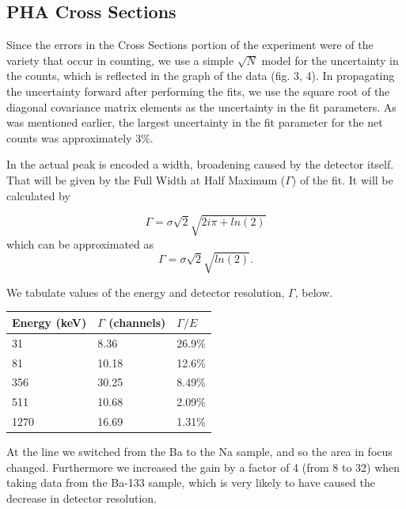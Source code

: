 \documentclass{article}
\begin{document}
	\subsection{PHA Cross Sections}
	Since the errors in the Cross Sections portion of the experiment were of the variety that occur in counting, we use a simple $\sqrt{N}$ model for the uncertainty in the counts, which is reflected in the graph of the data (fig. 3, 4).  In propagating the uncertainty forward after performing the fits, we use the square root of the diagonal covariance matrix elements as the uncertainty in the fit parameters.  As was mentioned earlier, the largest uncertainty in the fit parameter for the net counts was approximately 3\%.

	\begin{flushleft}
	In the actual peak is encoded a width, broadening caused by the detector itself. That will be given by the Full Width at Half Maximum ($\Gamma$) of the fit.  It will be calculated by
	\end{flushleft}
	\begin{equation*}
		\Gamma = \sigma \sqrt{2}\sqrt{2i\pi + ln(2)}
	\end{equation*}
	which can be approximated as
	\begin{equation}
		\Gamma = \sigma \sqrt{2}\sqrt{ln(2)}.
	\end{equation}

	\begin{flushleft}
	We tabulate values of the energy and detector resolution, $\Gamma$, below.
	\end{flushleft}

	\begin{center}
	\begin{tabular}{|l|l|l|}
		\hline
		Energy (keV) & $\Gamma$ (channels) & $\Gamma/E$\\ \hline \hline
		31 & 8.36 & 26.9\%\\
		81 & 10.18 & 12.6\%\\
		356 & 30.25 & 8.49\%\\ \hline
		511 & 10.68 & 2.09\%\\
		1270 & 16.69 & 1.31\%\\
		\hline
	\end{tabular}
	\end{center}

	\begin{flushleft}
	At the line we switched from the Ba to the Na sample, and so the area in focus changed.  Furthermore we increased the gain by a factor of 4 (from 8 to 32) when taking data from the Ba-133 sample, which is very likely to have caused the decrease in detector resolution.
	\end{flushleft}
\end{document}
